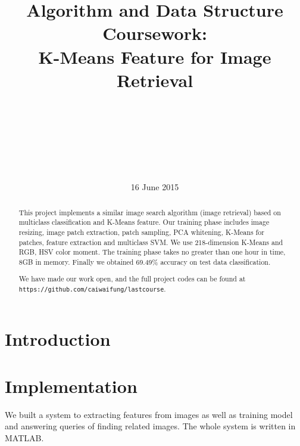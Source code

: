 \documentclass{acm_proc_article-sp}
\begin{document}
\title{Algorithm and Data Structure Coursework: \\K-Means Feature for
Image Retrieval}
\subtitle{}
%
%
\author{\\
       \\
       \\
   \\
       \\
       \\
}
\date{16 June 2015}

\maketitle
\begin{abstract}
        This project implements a similar image search algorithm (image
        retrieval) based on multiclass classification and K-Means feature. Our
        training phase includes image resizing, image patch extraction, patch
        sampling, PCA whitening, K-Means for patches, feature extraction and
        multiclass SVM\@. We use 218-dimension K-Means and RGB, HSV color moment.
        The training phase takes no greater than one hour in time, 8GB in memory.
        Finally we obtained 69.49\% accuracy on test data classification.

We have made our work open, and the full project codes can be found at
\texttt{https://github.com/caiwaifung/lastcourse}.
\end{abstract}


\section{Introduction}

\section{Implementation}
We built a system to extracting features from images as well as
    training model and answering queries of finding related images.
The whole system is written in MATLAB\@.
\end{document}
